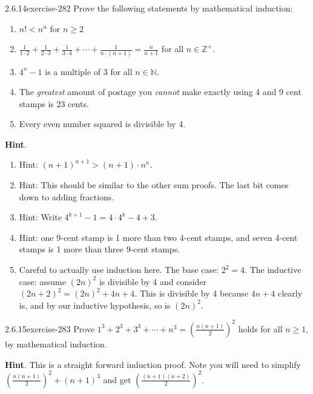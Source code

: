\documentclass[twoside,11pt,]{book}
\numberwithin{equation}{chapter}
\renewcommand{\d}{\displaystyle}
\newcommand{\N}{\mathbb N}
\newcommand{\Z}{\mathbb Z}
\newcommand{\lt}{<}
\begin{document}
\begin{divisionsolution}{2.6.14}{}{exercise-282}%
\hypertarget{p-3819}{}%
Prove the following statements by mathematical induction:\leavevmode%
\begin{enumerate}[label=(\alph*)]
\item\hypertarget{li-2035}{}\(n! \lt n^n\) for \(n \ge 2\)%
\item\hypertarget{li-2036}{}\(\d\frac{1}{1\cdot 2} + \frac{1}{2\cdot 3} +\frac{1}{3\cdot 4}+\cdots + \frac{1}{n\cdot(n+1)} = \d\frac{n}{n+1}\) for all \(n \in \Z^+\).%
\item\hypertarget{li-2037}{}\(4^n - 1\) is a multiple of 3 for all \(n \in \N\).%
\item\hypertarget{li-2038}{}\hypertarget{p-3820}{}%
The \emph{greatest} amount of postage you \emph{cannot} make exactly using 4 and 9 cent stamps is 23 cents.%
\item\hypertarget{li-2039}{}\hypertarget{p-3821}{}%
Every even number squared is divisible by 4.%
\end{enumerate}
%
\par\smallskip%
\noindent\textbf{Hint}.\quad%
\hypertarget{p-3822}{}%
\leavevmode%
\begin{enumerate}[label=(\alph*)]
\item\hypertarget{li-2040}{}\hypertarget{p-3823}{}%
Hint: \((n+1)^{n+1} > (n+1) \cdot n^{n}\).%
\item\hypertarget{li-2041}{}\hypertarget{p-3824}{}%
Hint: This should be similar to the other sum proofs. The last bit comes down to adding fractions.%
\item\hypertarget{li-2042}{}\hypertarget{p-3825}{}%
Hint: Write \(4^{k+1} - 1 = 4\cdot 4^k - 4 + 3\).%
\item\hypertarget{li-2043}{}\hypertarget{p-3826}{}%
Hint: one 9-cent stamp is 1 more than two 4-cent stamps, and seven 4-cent stamps is 1 more than three 9-cent stamps.%
\item\hypertarget{li-2044}{}\hypertarget{p-3827}{}%
Careful to actually use induction here. The base case: \(2^2 = 4\). The inductive case: assume \((2n)^2\) is divisible by 4 and consider \((2n+2)^2 = (2n)^2 + 4n + 4\). This is divisible by 4 because \(4n +4\) clearly is, and by our inductive hypothesis, so is \((2n)^2\).%
\end{enumerate}
%
\end{divisionsolution}%
\begin{divisionsolution}{2.6.15}{}{exercise-283}%
\hypertarget{p-3828}{}%
Prove \(1^3 + 2^3 + 3^3 + \cdots + n^3 = \left(\frac{n(n+1)}{2}\right)^2\) holds for all \(n \ge 1\), by mathematical induction.%
\par\smallskip%
\noindent\textbf{Hint}.\quad%
\hypertarget{p-3829}{}%
This is a straight forward induction proof. Note you will need to simplify \(\left(\frac{n(n+1)}{2}\right)^2 + (n+1)^3\) and get \(\left(\frac{(n+1)(n+2)}{2}\right)^2\).%
\end{divisionsolution}%
\end{document}
